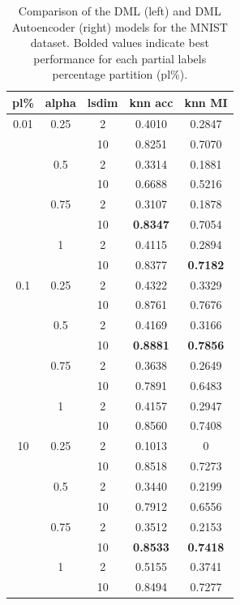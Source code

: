 \documentclass[./dissertation.tex]{subfiles}
\begin{document}
\begin{table}[]
\begin{tabular}{|c|c|c|c|c|}
            \hline
            \textbf{pl\%} & \textbf{alpha} & \textbf{lsdim} & \textbf{knn acc} & \textbf{knn MI}  \\
            \hline
            0.01 & 0.25 & 2 & 0.4010 & 0.2847 \\
             &  & 10 & 0.8251 & 0.7070 \\
             & 0.5 & 2 & 0.3314 & 0.1881 \\
             &  & 10 & 0.6688 & 0.5216 \\
             & 0.75 & 2 & 0.3107 & 0.1878 \\
             &  & 10 & \textbf{0.8347} & 0.7054 \\
             & 1 & 2 & 0.4115 & 0.2894 \\
             &  & 10 & 0.8377 & \textbf{0.7182} \\
            0.1 & 0.25 & 2 & 0.4322 & 0.3329 \\
             &  & 10 & 0.8761 & 0.7676 \\
             & 0.5 & 2 & 0.4169 & 0.3166 \\
             &  & 10 & \textbf{0.8881} & \textbf{0.7856} \\
             & 0.75 & 2 & 0.3638 & 0.2649 \\
             &  & 10 & 0.7891 & 0.6483 \\
             & 1 & 2 & 0.4157 & 0.2947 \\
             &  & 10 & 0.8560 & 0.7408 \\
            10 & 0.25 & 2 & 0.1013 & 0 \\
             &  & 10 & 0.8518 & 0.7273 \\
             & 0.5 & 2 & 0.3440 & 0.2199 \\
             &  & 10 & 0.7912 & 0.6556 \\
             & 0.75 & 2 & 0.3512 & 0.2153 \\
             &  & 10 & \textbf{0.8533} & \textbf{0.7418} \\
             & 1 & 2 & 0.5155 & 0.3741 \\
             &  & 10 & 0.8494 & 0.7277 \\
            \hline
       \end{tabular}
       \caption{Comparison of the DML (left) and DML Autoencoder (right) models for the MNIST dataset. Bolded values indicate best performance for each partial labels percentage partition (pl\%).\\}
       \label{tab:my_label}
   \end{table}
\end{document}
